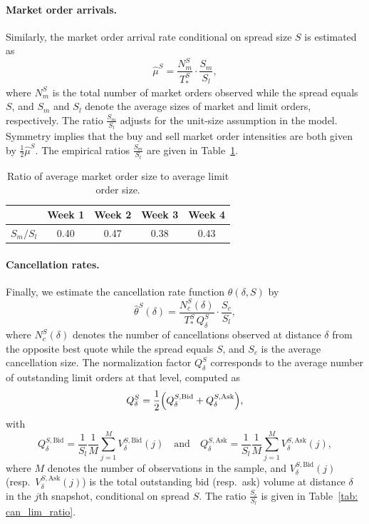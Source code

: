 \documentclass[11pt]{article}
\begin{document}
\paragraph{Market order arrivals.}
Similarly, the market order arrival rate conditional on spread size $S$ is estimated as
\begin{equation}\label{mu_est}
    \hat{\mu}^S
    =
    \frac{N_m^S}{T_*^S}\cdot \frac{S_m}{S_l},
\end{equation}
where $N_m^S$ is the total number of market orders observed while the spread equals $S$, and $S_m$ and $S_l$ denote the average sizes of market and limit orders, respectively. 
The ratio $\tfrac{S_m}{S_l}$ adjusts for the unit-size assumption in the model. 
Symmetry implies that the buy and sell market order intensities are both given by $\tfrac{1}{2}\hat{\mu}^S$. 
The empirical ratios $\tfrac{S_m}{S_l}$ are given in Table~\ref{tab: mark_lim_ratio}.

\begin{table}[h]
    \centering
    \begin{tabular}{r c c c c}\toprule
        & Week 1 & Week 2 & Week 3 & Week 4\\ \midrule
        $S_m / S_l$ & 0.40 & 0.47 & 0.38 & 0.43 \\ \bottomrule
    \end{tabular}
    \caption{Ratio of average market order size to average limit order size.}
    \label{tab: mark_lim_ratio}
\end{table}

\paragraph{Cancellation rates.}
Finally, we estimate the cancellation rate function $\theta(\delta,S)$ by
\begin{equation}\label{theta_est}
    \hat{\theta}^S(\delta)
    =
    \frac{N_c^S(\delta)}{T_*^S\,Q_\delta^S}\cdot \frac{S_c}{S_l},
\end{equation}
where $N_c^S(\delta)$ denotes the number of cancellations observed at distance $\delta$ from the opposite best quote while the spread equals $S$, and $S_c$ is the average cancellation size.
The normalization factor $Q_\delta^S$ corresponds to the average number of outstanding limit orders at that level, computed as
\[
Q_\delta^S
=
\frac{1}{2}\Bigl(Q_\delta^{S,\text{Bid}}+Q_\delta^{S,\text{Ask}}\Bigr),
\]
with
\begin{equation}
    Q_\delta^{S,\text{Bid}}
    =
    \frac{1}{S_l}\frac{1}{M}\sum_{j=1}^M V_{\delta}^{S,\text{Bid}}(j)
    \quad\text{and}\quad
    Q_\delta^{S,\text{Ask}}
    =
    \frac{1}{S_l}\frac{1}{M}\sum_{j=1}^M V_{\delta}^{S,\text{Ask}}(j),
\end{equation}
where $M$ denotes the number of observations in the sample, and $V_{\delta}^{S,\text{Bid}}(j)$ (resp.\ $V_{\delta}^{S,\text{Ask}}(j)$) is the total outstanding bid (resp.\ ask) volume at distance $\delta$ in the $j$th snapshot, conditional on spread $S$.
The ratio $\tfrac{S_c}{S_l}$ is given in Table~\ref{tab: can_lim_ratio}.
\end{document}
